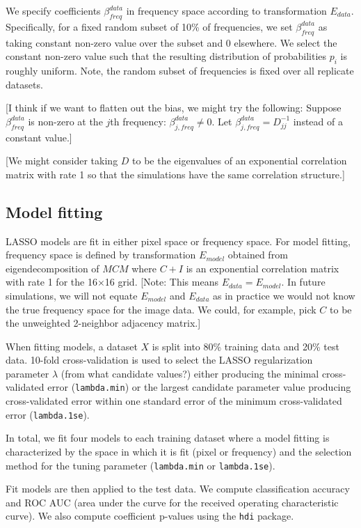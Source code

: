 \documentclass[12pt]{article}
\begin{document}
We specify coefficients $\beta^{data}_{freq}$ in frequency space according to transformation $E_{data}$. Specifically, for a fixed random subset of 10\% of frequencies, we set $\beta^{data}_{freq}$ as taking constant non-zero value over the subset and 0 elsewhere. We select the constant non-zero value such that the resulting distribution of probabilities $p_i$ is roughly uniform. Note, the random subset of frequencies is fixed over all replicate datasets.

[I think if we want to flatten out the bias, we might try the following: Suppose $\beta^{data}_{freq}$ is non-zero at the $j$th frequency: $\beta^{data}_{j,freq}\neq 0$. Let $\beta^{data}_{j,freq}=D_{jj}^{-1}$ instead of a constant value.]

[We might consider taking $D$ to be the eigenvalues of an exponential correlation matrix with rate 1 so that the simulations have the same correlation structure.]

\subsection*{Model fitting}

LASSO models are fit in either pixel space or frequency space. For model fitting, frequency space is defined by transformation $E_{model}$ obtained from eigendecomposition of $MCM$ where $C+I$ is an exponential correlation matrix with rate 1 for the 16$\times$16 grid. [Note: This means $E_{data}=E_{model}$. In future simulations, we will not equate $E_{model}$ and $E_{data}$ as in practice we would not know the true frequency space for the image data. We could, for example, pick $C$ to be the unweighted 2-neighbor adjacency matrix.]

When fitting models, a dataset $X$ is split into 80\% training data and 20\% test data. 10-fold cross-validation is used to select the LASSO regularization parameter $\lambda$ (from what candidate values?) either producing the minimal cross-validated error (\verb|lambda.min|) or the largest candidate parameter value producing cross-validated error within one standard error of the minimum cross-validated error (\verb|lambda.1se|).

In total, we fit four models to each training dataset where a model fitting is characterized by the space in which it is fit (pixel or frequency) and the selection method for the tuning parameter (\verb|lambda.min| or \verb|lambda.1se|).

Fit models are then applied to the test data. We compute classification accuracy and ROC AUC (area under the curve for the received operating characteristic curve). We also compute coefficient p-values using the \verb|hdi| package.
\end{document}
